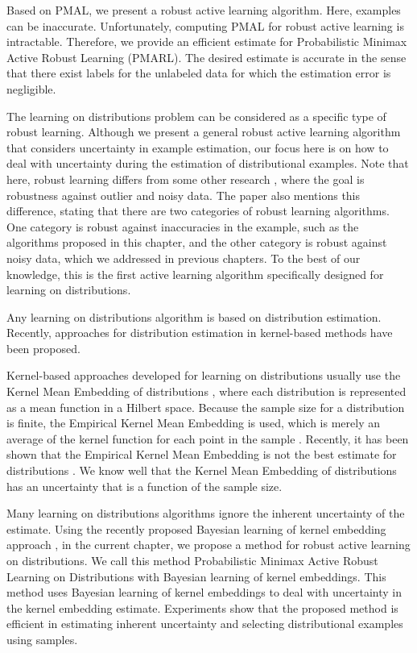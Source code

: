 \documentclass[12pt]{article}
\begin{document}
	Based on PMAL, we present a robust active learning algorithm. Here, examples can be inaccurate. Unfortunately, computing PMAL for robust active learning is intractable. Therefore, we provide an efficient estimate for Probabilistic Minimax Active Robust Learning (PMARL). The desired estimate is accurate in the sense that there exist labels for the unlabeled data for which the estimation error is negligible.
	
	The learning on distributions problem can be considered as a specific type of robust learning. Although we present a general robust active learning algorithm that considers uncertainty in example estimation, our focus here is on how to deal with uncertainty during the estimation of distributional examples. Note that here, robust learning differs from some other research \cite{karimi2016statistical, xu2007regularization}, where the goal is robustness against outlier and noisy data. The paper \cite{xu2007regularization} also mentions this difference, stating that there are two categories of robust learning algorithms. One category is robust against inaccuracies in the example, such as the algorithms proposed in this chapter, and the other category is robust against noisy data, which we addressed in previous chapters. To the best of our knowledge, this is the first active learning algorithm specifically designed for learning on distributions.
	
	Any learning on distributions algorithm is based on distribution estimation. Recently, approaches for distribution estimation in kernel-based methods have been proposed.
	
	Kernel-based approaches developed for learning on distributions usually use the Kernel Mean Embedding of distributions \cite{smola2007hilbert}, where each distribution is represented as a mean function in a Hilbert space. Because the sample size for a distribution is finite, the Empirical Kernel Mean Embedding is used, which is merely an average of the kernel function for each point in the sample \cite{muandet2012domain}. Recently, it has been shown that the Empirical Kernel Mean Embedding is not the best estimate for distributions \cite{law2018gaussian}. We know well that the Kernel Mean Embedding of distributions has an uncertainty that is a function of the sample size.
	
	Many learning on distributions algorithms ignore the inherent uncertainty of the estimate. Using the recently proposed Bayesian learning of kernel embedding approach \cite{flaxman2015fast}, in the current chapter, we propose a method for robust active learning on distributions. We call this method Probabilistic Minimax Active Robust Learning on Distributions with Bayesian learning of kernel embeddings. This method uses Bayesian learning of kernel embeddings to deal with uncertainty in the kernel embedding estimate. Experiments show that the proposed method is efficient in estimating inherent uncertainty and selecting distributional examples using samples.
	
\end{document}
